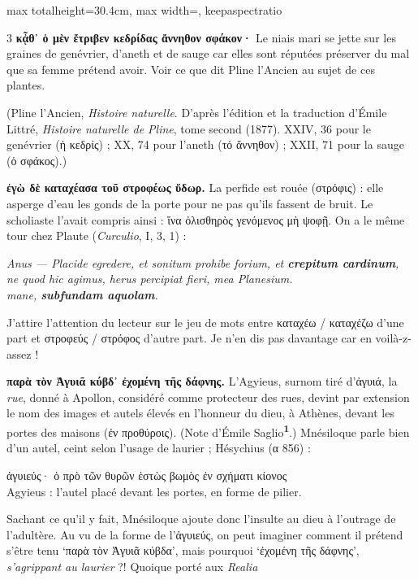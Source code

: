 \documentclass[11pt,twoside]{book}
\newcommand{\italique}[1]{\textit{#1}}
\newcommand{\citComm}[1]{\begin{quoting}[vskip=0.4pt,leftmargin=0.7em,rightmargin=0.2em]#1\end{quoting}}
\newcommand{\francais}[1]{{\policeFr #1}}
\newcommand{\latin}[1]{\textit{#1}}
\newcommand{\marqueur}[1]{\textsuperscript{\color{rubricRed}\textbf{#1}}}
\begin{document}
\begin{adjustbox}{max totalheight=30.4cm, max width=\textwidth, keepaspectratio}
\begin{minipage}{\textwidth}
{\begin{multicols}{3}
 \textbf{κᾆθ᾽ ὁ μὲν ἔτριβεν κεδρίδας ἄννηθον σφάκον·} Le niais mari se jette sur les graines de genévrier, d'aneth et de sauge car elles sont réputées préserver du mal que sa femme prétend avoir. Voir ce que dit Pline l'Ancien au sujet de ces plantes.
\par\vspace{1.5pt}
\noindent (Pline l'Ancien, \italique{Histoire naturelle}. D'après l'édition et la traduction d'Émile Littré, \italique{Histoire naturelle de Pline}, tome second (1877). XXIV, 36 pour le genévrier (ἡ κεδρίς) ; XX, 74 pour l'aneth (τό ἄννηθον) ; XXII, 71 pour la sauge (ὁ σφάκος).)
\par\vspace{1.5pt}
 \textbf{ἐγὼ δὲ καταχέασα τοῦ στροφέως ὕδωρ.} La perfide est rouée (στρόφις) : elle asperge d'eau les gonds de la porte pour ne pas qu'ils fassent de bruit. Le scholiaste l'avait compris ainsi : ἵνα ὀλισθηρὸς γενόμενος μὴ ψοφῇ. On a le même tour chez Plaute (\italique{Curculio}, I, 3, 1) :
\citComm{\latin{Anus — Placide egredere, et sonitum prohibe forium, et \textbf{crepitum cardinum},\\
ne quod hic agimus, herus percipiat fieri, mea Planesium.\\
mane, \textbf{subfundam aquolam}.}
}
\par\vspace{1.5pt}
\noindent J'attire l'attention du lecteur sur le jeu de mots entre καταχέω / καταχέζω d'une part et στροφεύς / στρόφος d'autre part. Je n'en dis pas davantage car en voilà-z-assez !
\par\vspace{1.5pt}
 \textbf{παρὰ τὸν Ἀγυιᾶ κύβδ᾽ ἐχομένη τῆς δάφνης.} L'Agyieus, surnom tiré d'ἀγυιά, la \italique{rue}, donné à Apollon, considéré comme protecteur des rues, devint par extension le nom des images et autels élevés en l'honneur du dieu, à Athènes, devant les portes des maisons (ἐν προθύροις). (Note d'Émile Saglio\marqueur{1}.) Mnésiloque parle bien d'un autel, ceint selon l'usage de laurier ; Hésychius (α 856) :
\citComm{ἀγυιεύς· ὁ πρὸ τῶν θυρῶν ἑστὼς βωμὸς ἐν σχήματι κίονος\\
\francais{Agyieus : l'autel placé devant les portes, en forme de pilier.}}
\par\vspace{1.5pt}
\noindent Sachant ce qu'il y fait, Mnésiloque ajoute donc l'insulte au dieu à l'outrage de l'adultère. Au vu de la forme de l'ἀγυιεύς, on peut imaginer comment il prétend s'être tenu `παρὰ τὸν Ἀγυιᾶ κύβδα', mais pourquoi `ἐχομένη τῆς δάφνης', \italique{s'agrippant au laurier} ?! Quoique porté aux \italique{Realia}

\end{multicols}}
\end{minipage}
\end{adjustbox}
\end{document}
